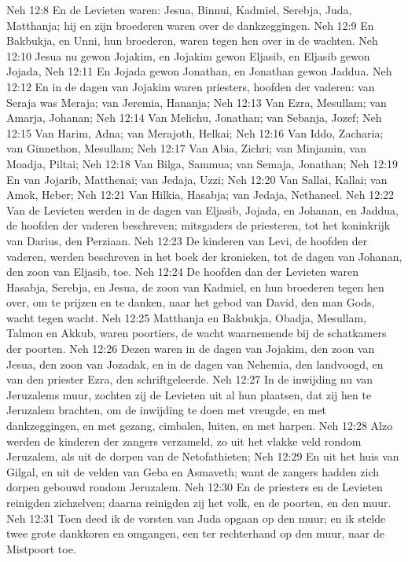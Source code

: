 Neh 12:8  En de Levieten waren: Jesua, Binnui, Kadmiel, Serebja, Juda, Matthanja; hij en zijn broederen waren over de dankzeggingen.
Neh 12:9  En Bakbukja, en Unni, hun broederen, waren tegen hen over in de wachten.
Neh 12:10  Jesua nu gewon Jojakim, en Jojakim gewon Eljasib, en Eljasib gewon Jojada,
Neh 12:11  En Jojada gewon Jonathan, en Jonathan gewon Jaddua.
Neh 12:12  En in de dagen van Jojakim waren priesters, hoofden der vaderen: van Seraja was Meraja; van Jeremia, Hananja;
Neh 12:13  Van Ezra, Mesullam; van Amarja, Johanan;
Neh 12:14  Van Melichu, Jonathan; van Sebanja, Jozef;
Neh 12:15  Van Harim, Adna; van Merajoth, Helkai;
Neh 12:16  Van Iddo, Zacharia; van Ginnethon, Mesullam;
Neh 12:17  Van Abia, Zichri; van Minjamin, van Moadja, Piltai;
Neh 12:18  Van Bilga, Sammua; van Semaja, Jonathan;
Neh 12:19  En van Jojarib, Matthenai; van Jedaja, Uzzi;
Neh 12:20  Van Sallai, Kallai; van Amok, Heber;
Neh 12:21  Van Hilkia, Hasabja; van Jedaja, Nethaneel.
Neh 12:22  Van de Levieten werden in de dagen van Eljasib, Jojada, en Johanan, en Jaddua, de hoofden der vaderen beschreven; mitsgaders de priesteren, tot het koninkrijk van Darius, den Perziaan.
Neh 12:23  De kinderen van Levi, de hoofden der vaderen, werden beschreven in het boek der kronieken, tot de dagen van Johanan, den zoon van Eljasib, toe.
Neh 12:24  De hoofden dan der Levieten waren Hasabja, Serebja, en Jesua, de zoon van Kadmiel, en hun broederen tegen hen over, om te prijzen en te danken, naar het gebod van David, den man Gods, wacht tegen wacht.
Neh 12:25  Matthanja en Bakbukja, Obadja, Mesullam, Talmon en Akkub, waren poortiers, de wacht waarnemende bij de schatkamers der poorten.
Neh 12:26  Dezen waren in de dagen van Jojakim, den zoon van Jesua, den zoon van Jozadak, en in de dagen van Nehemia, den landvoogd, en van den priester Ezra, den schriftgeleerde.
Neh 12:27  In de inwijding nu van Jeruzalems muur, zochten zij de Levieten uit al hun plaatsen, dat zij hen te Jeruzalem brachten, om de inwijding te doen met vreugde, en met dankzeggingen, en met gezang, cimbalen, luiten, en met harpen.
Neh 12:28  Alzo werden de kinderen der zangers verzameld, zo uit het vlakke veld rondom Jeruzalem, als uit de dorpen van de Netofathieten;
Neh 12:29  En uit het huis van Gilgal, en uit de velden van Geba en Asmaveth; want de zangers hadden zich dorpen gebouwd rondom Jeruzalem.
Neh 12:30  En de priesters en de Levieten reinigden zichzelven; daarna reinigden zij het volk, en de poorten, en den muur.
Neh 12:31  Toen deed ik de vorsten van Juda opgaan op den muur; en ik stelde twee grote dankkoren en omgangen, een ter rechterhand op den muur, naar de Mistpoort toe.
